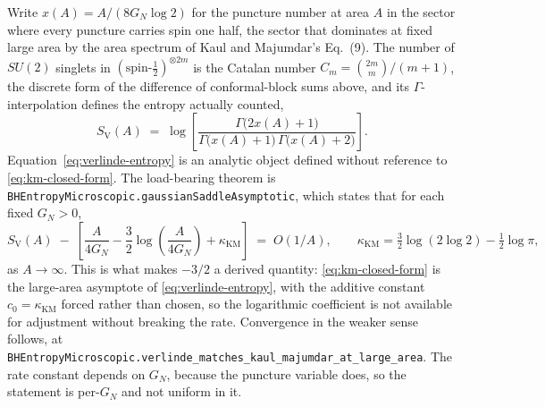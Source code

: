 \documentclass[aps,prd,nofootinbib,superscriptaddress,12pt]{revtex4-2}
\DeclareRobustCommand{\lb}{\discretionary{}{}{}}
\begin{document}
Write $x(A) = A/(8G_N\log 2)$ for the puncture number at area $A$ in the sector where every
puncture carries spin one half, the sector that dominates at fixed large area by the area
spectrum of Kaul and Majumdar's Eq.~(9). The number of $SU(2)$ singlets in
$(\text{spin-}\tfrac12)^{\otimes 2m}$ is the Catalan number
$C_m = \binom{2m}{m}/(m+1)$, the discrete form of the difference of conformal-block sums
above, and its $\Gamma$-interpolation defines the entropy actually counted,
\begin{equation}
\label{eq:verlinde-entropy}
S_{\mathrm V}(A) \;=\; \log\!\left[\frac{\Gamma\bigl(2x(A)+1\bigr)}{\Gamma\bigl(x(A)+1\bigr)\,\Gamma\bigl(x(A)+2\bigr)}\right] .
\end{equation}
Equation~\eqref{eq:verlinde-entropy} is an analytic object defined without reference to
\eqref{eq:km-closed-form}. The load-bearing theorem is
\texttt{BHEntropy\lb{}Microscopic.\lb{}gaussian\lb{}Saddle\lb{}Asymptotic}, which states that for each fixed
$G_N > 0$,
\begin{equation}
\label{eq:saddle-rate}
S_{\mathrm V}(A) \;-\; \left[\frac{A}{4G_N} - \frac{3}{2}\log\!\left(\frac{A}{4G_N}\right) + \kappa_{\mathrm{KM}}\right] \;=\; O(1/A) ,
\qquad
\kappa_{\mathrm{KM}} = \tfrac{3}{2}\log(2\log 2) - \tfrac{1}{2}\log\pi ,
\end{equation}
as $A \to \infty$. This is what makes $-3/2$ a derived quantity: \eqref{eq:km-closed-form}
is the large-area asymptote of \eqref{eq:verlinde-entropy}, with the additive constant
$c_0 = \kappa_{\mathrm{KM}}$ forced rather than chosen, so the logarithmic coefficient is
not available for adjustment without breaking the rate. Convergence in the weaker sense
follows, at \texttt{BHEntropy\lb{}Microscopic.\lb{}verlinde\_\lb{}matches\_\lb{}kaul\_\lb{}majumdar\_\lb{}at\_\lb{}large\_\lb{}area}.
The rate constant depends on $G_N$, because the puncture variable does, so the statement is
per-$G_N$ and not uniform in it.
\end{document}
